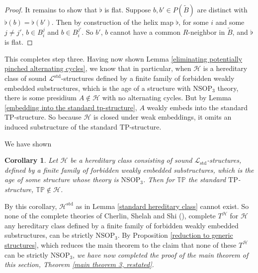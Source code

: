\documentclass{amsart}
\newtheorem{cor}[theorem]{Corollary}
\theoremstyle{definition}
\theoremstyle{remark}
\numberwithin{equation}{section}
\begin{document}
\begin{proof}
    It remains to show that $\flat$ is flat. Suppose $b, b' \in P(\tilde{B})$ are distinct with $\flat(b) = \flat(b')$. Then by construction of the helix map $\flat$, for some $i$ and some $j \neq j'$, $b \in B^{j}_{i}$ and $b \in B^{j'}_{i}$. So $b'$, $b$ cannot have a common $R$-neighbor in $\tilde{B}$, and $\flat$ is flat.

    
     \end{proof}

This completes step three. Having now shown Lemma \ref{eliminating potentially pinched alternating cycles}, we know that in particular, when $\mathcal{H}$ is a hereditary class of sound $\mathcal{L}^{\mathrm{std}}$-structures defined by a finite family of forbidden weakly embedded substructures, which is the age of a structure with $\mathrm{NSOP}_{3}$ theory, there is some presidium $A \notin \mathcal{H}$ with no alternating cycles. But by Lemma \ref{embedding into the standard tp-structure}, $A$ weakly embeds into the standard $\mathrm{TP}$-structure.  So because $\mathcal{H}$ is closed under weak embeddings, it omits an induced substructure of the standard $\mathrm{TP}$-structure.


We have shown

\begin{cor}
\label{main combinatorial lemma}
Let $\mathcal{H}$ be a hereditary class consisting of sound $\mathcal{L}_{\mathrm{std}}$-structures, defined by a finite family of forbidden weakly embedded substructures, which is the age of some structure whose theory is $\mathrm{NSOP}_{3}$. Then for $\mathbb{TP}$ the standard $\mathrm{TP}$-structure, $\mathbb{TP} \notin \mathcal{H}$.  


\end{cor}


By this corollary, $\mathcal{H}^{\mathrm{std}}$ as in Lemma \ref{standard hereditary class} cannot exist. So none of the complete theories of Cherlin, Shelah and Shi (\cite{CSS99}), complete $T^{\mathcal{H}}$ for $\mathcal{H}$ any hereditary class defined by a finite family of forbidden weakly embedded substructures, can be strictly $\mathrm{NSOP}_{3}$.  By Proposition \ref{reduction to generic structures}, which reduces the main theorem to the claim that none of these $T^{\mathcal{H}}$ can be strictly $\mathrm{NSOP}_{3}$, \textit{we have now completed the proof of the main theorem of this section, Theorem \ref{main theorem 3, restated}.}
\end{document}
